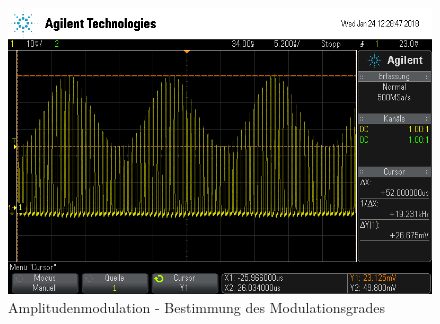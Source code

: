 \begin{figure}
	\centering
	\includegraphics[width=\textwidth]{img/c_scope_247.png}
	\caption{Amplitudenmodulation - Bestimmung des Modulationsgrades}
\end{figure}

